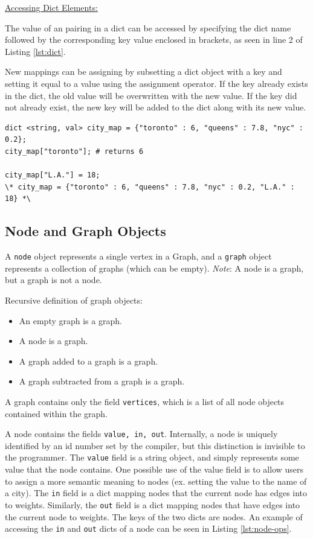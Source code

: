 \documentclass{article}
\newcommand{\code}[1]{\texttt{#1}} %
\begin{document}
\underline{Accessing Dict Elements:}

The value of an pairing in a dict can be accessed by specifying the dict name followed by the corresponding key value enclosed in brackets, as seen in line 2 of Listing \ref{lst:dict}.

New mappings can be assigning by subsetting a dict object with a key and setting it equal to a value using the assignment operator. If the key already exists in the dict, the old value will be overwritten with the new value. If the key did not already exist, the new key will be added to the dict along with its new value.


\begin{lstlisting}[language=pltLang, caption=The ``dict'' type., label=lst:dict]
dict <string, val> city_map = {"toronto" : 6, "queens" : 7.8, "nyc" : 0.2};
city_map["toronto"]; # returns 6

city_map["L.A."] = 18;
\* city_map = {"toronto" : 6, "queens" : 7.8, "nyc" : 0.2, "L.A." : 18} *\

\end{lstlisting}

\subsection{Node and Graph Objects}

A \code{node} object represents a single vertex in a Graph, and a \code{graph} object represents a collection of graphs (which can be empty). \emph{Note}: A node is a graph, but a graph is not a node.

Recursive definition of graph objects:
\begin{itemize}
\item An empty graph is a graph.
\item A node is a graph.
\item A graph added to a graph is a graph.
\item A graph subtracted from a graph is a graph.
\end{itemize}

A graph contains only the field \code{vertices}, which is a list of all node objects contained within the graph. 

A node contains the fields \code{value, in, out}. Internally, a node is uniquely identified by an id number set by the compiler, but this distinction is invisible to the programmer. The \code{value} field is a string object, and simply represents some value that the node contains. One possible use of the value field is to allow users to assign a more semantic meaning to nodes (ex. setting the value to the name of a city). The \code{in} field is a dict mapping nodes that the current node has edges into to weights. Similarly, the \code{out} field is a dict mapping nodes that have edges into the current node to weights. The keys of the two dicts are nodes. An example of accessing the \code{in} and \code{out} dicts of a node can be seen in Listing \ref{lst:node-ops}.
\end{document}
